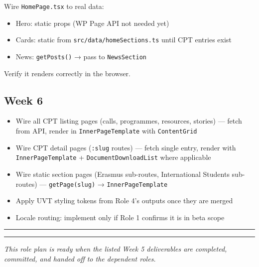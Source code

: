 \documentclass[11pt,a4paper]{article}
\newcommand{\grouprule}{\vspace{0.3em}\textcolor{ruleLine}{\rule{\linewidth}{0.4pt}}\vspace{0.3em}}
\begin{document}
Wire \nolinkurl{HomePage.tsx} to real data:
\begin{itemize}
\item Hero: static props (WP Page API not needed yet)
\item Cards: static from \nolinkurl{src/data/homeSections.ts} until CPT entries exist
\item News: \nolinkurl{getPosts()} → pass to \nolinkurl{NewsSection}
\end{itemize}

Verify it renders correctly in the browser.

\subsection{Week 6}

\begin{itemize}
\item Wire all CPT listing pages (calls, programmes, resources, stories) — fetch from API, render in \nolinkurl{InnerPageTemplate} with \nolinkurl{ContentGrid}
\item Wire CPT detail pages (\nolinkurl{:slug} routes) — fetch single entry, render with \nolinkurl{InnerPageTemplate} + \nolinkurl{DocumentDownloadList} where applicable
\item Wire static section pages (Erasmus sub-routes, International Students sub-routes) — \nolinkurl{getPage(slug)} → \nolinkurl{InnerPageTemplate}
\item Apply UVT styling tokens from Role 4's outputs once they are merged
\item Locale routing: implement only if Role 1 confirms it is in beta scope
\end{itemize}

\grouprule
\vspace{1.2em}
\textcolor{uvtYellow}{\rule{\linewidth}{1.5pt}}

{\small\textit{This role plan is ready when the listed Week 5 deliverables are completed, committed, and handed off to the dependent roles.}}
\end{document}
